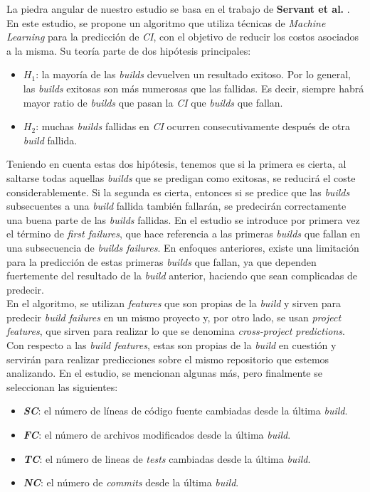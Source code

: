 La piedra angular de nuestro estudio se basa en el trabajo de \textbf{Servant et al.} \cite{2}. En
este estudio, se propone un algoritmo que utiliza técnicas de \textit{Machine Learning}
para la predicción de \textit{CI}, con el objetivo de reducir los costos asociados a la misma.
Su teoría parte de dos hipótesis principales:

\begin{itemize}
      \item \textit{$H_1$}: la mayoría de las \textit{builds} devuelven un resultado exitoso. Por
      lo general, las \textit{builds} exitosas son más numerosas que las fallidas. Es decir,
      siempre habrá mayor ratio de \textit{builds} que pasan la \textit{CI} que \textit{builds}
      que fallan.
      \item \textit{$H_2$}: muchas \textit{builds} fallidas en \textit{CI} ocurren
      consecutivamente después de otra \textit{build} fallida.
\end{itemize}

Teniendo en cuenta estas dos hipótesis, tenemos que si la primera es cierta, al saltarse todas
aquellas \textit{builds} que se predigan como exitosas, se reducirá el coste considerablemente.
Si la segunda es cierta, entonces si se predice que las \textit{builds} subsecuentes a una
\textit{build} fallida también fallarán, se predecirán correctamente una buena parte de las
\textit{builds} fallidas. En el estudio se introduce por primera vez el término de \textit{first
failures}, que hace referencia a las primeras \textit{builds} que fallan en una subsecuencia de
\textit{builds failures}. En enfoques anteriores, existe una limitación para la predicción
de estas primeras \textit{builds} que fallan, ya que dependen fuertemente del resultado de la
\textit{build} anterior, haciendo que sean complicadas de predecir.\\

En el algoritmo, se utilizan \textit{features} que son propias de la \textit{build} y
sirven para predecir \textit{build failures} en un mismo proyecto y, por otro lado, se usan
\textit{project features}, que sirven para realizar lo que se denomina \textit{cross-project
predictions}. Con respecto a las \textit{build features}, estas son propias de la \textit{build}
en cuestión y servirán para realizar predicciones sobre el mismo repositorio que estemos
analizando. En el estudio, se mencionan algunas más, pero finalmente se seleccionan las
siguientes:

\begin{itemize}
      \item \textbf{\textit{SC}}: el número de líneas de código fuente cambiadas desde la
      última \textit{build}.
      \item \textbf{\textit{FC}}: el número de archivos modificados desde la última
      \textit{build}.
      \item \textbf{\textit{TC}}: el número de lineas de \textit{tests} cambiadas desde la
      última \textit{build}.
      \item \textbf{\textit{NC}}: el número de \textit{commits} desde la última \textit{build}.
\end{itemize}

